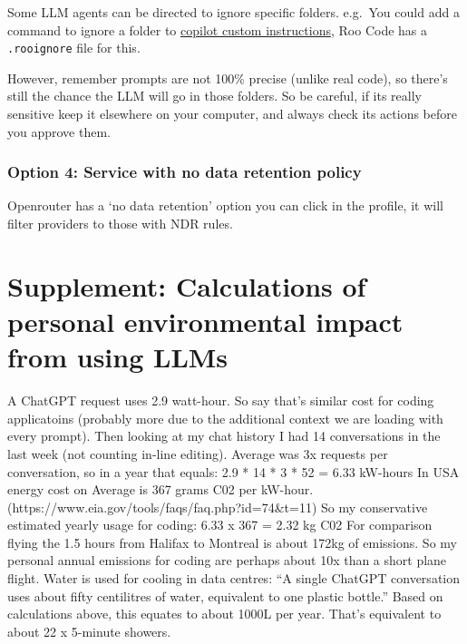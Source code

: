 \documentclass[
  letterpaper,
  DIV=11,
  numbers=noendperiod]{scrreprt}
\begin{document}
Some LLM agents can be directed to ignore specific folders. e.g.~You
could add a command to ignore a folder to
\href{https://docs.github.com/en/copilot/customizing-copilot/adding-repository-custom-instructions-for-github-copilot}{copilot
custom instructions}, Roo Code has a \texttt{.rooignore} file for this.

However, remember prompts are not 100\% precise (unlike real code), so
there's still the chance the LLM will go in those folders. So be
careful, if its really sensitive keep it elsewhere on your computer, and
always check its actions before you approve them.

\subsubsection{Option 4: Service with no data retention
policy}\label{option-4-service-with-no-data-retention-policy}

Openrouter has a `no data retention' option you can click in the
profile, it will filter providers to those with NDR rules.

\section{Supplement: Calculations of personal environmental impact from
using
LLMs}\label{supplement-calculations-of-personal-environmental-impact-from-using-llms}

A ChatGPT request uses 2.9 watt-hour. So say that's similar cost for
coding applicatoins (probably more due to the additional context we are
loading with every prompt). Then looking at my chat history I had 14
conversations in the last week (not counting in-line editing). Average
was 3x requests per conversation, so in a year that equals: 2.9 * 14 * 3
* 52 = 6.33 kW-hours In USA energy cost on Average is 367 grams C02 per
kW-hour. (https://www.eia.gov/tools/faqs/faq.php?id=74\&t=11) So my
conservative estimated yearly usage for coding: 6.33 x 367 = 2.32 kg C02
For comparison flying the 1.5 hours from Halifax to Montreal is about
172kg of emissions. So my personal annual emissions for coding are
perhaps about 10x than a short plane flight. Water is used for cooling
in data centres: ``A single ChatGPT conversation uses about fifty
centilitres of water, equivalent to one plastic bottle.'' Based on
calculations above, this equates to about 1000L per year. That's
equivalent to about 22 x 5-minute showers.

\end{document}
